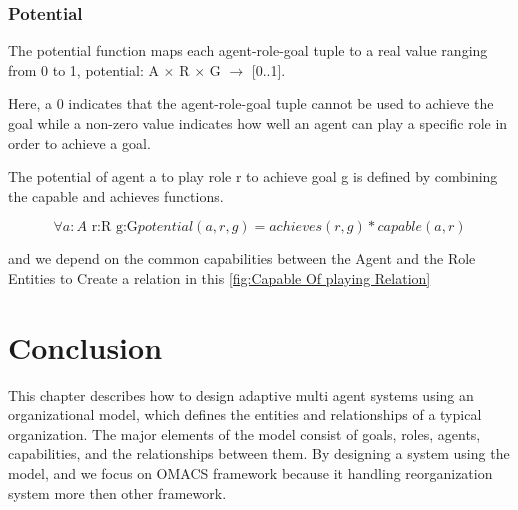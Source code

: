 \subsubsection{Potential}
The potential function maps each agent-role-goal tuple to a real value ranging from 0 to 1, 
potential: A $\times$ R $\times$ G $\rightarrow$ [0..1]\cite{omacs4}.

Here, a 0 indicates that the agent-role-goal tuple cannot be
used to achieve the goal while a non-zero value indicates how well an agent can play
a specific role in order to achieve a goal. 

The potential of agent a to play role r 
to achieve goal g is defined by combining the capable and achieves functions\cite{omacs4}.

\begin{equation}
\forall a:A\textrm{ r:R g:G}potential(a,r,g)=achieves(r,g)*capable(a,r)\label{eq:potentialFunc}
\end{equation}

and we depend on the common capabilities between the Agent and the Role Entities to Create a relation in this \ref{fig:Capable Of playing Relation} 


 


\section{Conclusion}
This chapter describes how to design adaptive multi agent systems using an organizational model, which defines the entities and relationships of a typical organization. 
The major elements of the model consist of goals, roles, agents, capabilities, and the relationships between them. By designing a system using the model, and we focus on OMACS framework because it handling reorganization system more then other framework.